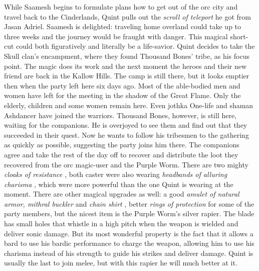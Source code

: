While Saamesh begins to formulate plans how to get out of the orc city and travel back to the Cinderlands, Quint pulls out the {\itshape scroll of teleport} he got from Jasan Adriel. Saamesh is delighted: traveling home overland could take up to three weeks and the journey would be fraught with danger. This magical short-cut could both figuratively and literally be a life-savior. Quint decides to take the Skull clan's encampment, where they found Thousand Bones' tribe, as his focus point. The magic does its work and the next moment the heroes and their new friend are back in the Kallow Hills. The camp is still there, but it looks emptier then when the party left here six days ago. Most of the able-bodied men and women have left for the meeting in the shadow of the Great Flame. Only the elderly, children and some women remain here. Even jothka One-life and shaman Ashdancer have joined the warriors. Thousand Bones, however, is still here, waiting for the companions. He is overjoyed to see them and find out that they succeeded in their quest. Now he wants to follow his tribesmen to the gathering as quickly as possible, suggesting the party joins him there. The companions agree and take the rest of the day off to recover and distribute the loot they recovered from the orc magic-user and the Purple Worm. There are two mighty {\itshape cloaks of resistance} , both caster were also wearing  {\itshape headbands of alluring charisma} , which were more powerful than the one Quint is wearing at the moment. There are other magical upgrades as well: a good  {\itshape amulet of natural armor, mithral buckler} and  {\itshape chain shirt} , better  {\itshape rings of protection} for some of the party members, but the nicest item is the Purple Worm's silver rapier. The blade has small holes that whistle in a high pitch when the weapon is wielded and deliver sonic damage. But its most wonderful property is the fact that it allows a bard to use his bardic performance to charge the weapon, allowing him to use his charisma instead of his strength to guide his strikes and deliver damage. Quint is usually the last to join melee, but with this rapier he will much better at it. 
